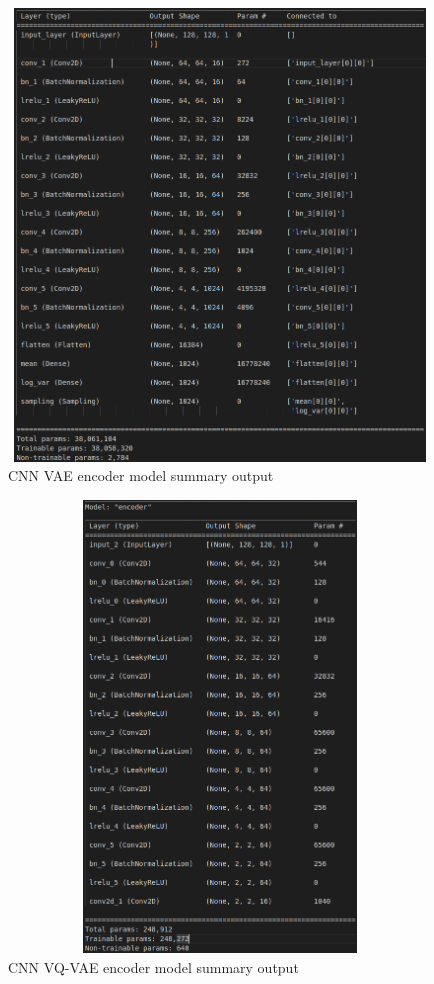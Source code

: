 \newpage

\begin{figure}[ht]
    \centering
    \includegraphics[width = 14cm, height = 12cm]{images/cnn-vae-encoder-output.png}
    \caption[]{CNN VAE encoder model summary output}
    \label{fig:cnnvaeencoderoutput}
\end{figure}

\newpage

\begin{figure}[ht]
    \centering
    \includegraphics[width = 14cm, height = 12cm]{images/cnn-vqvae-encoder-output.png}
    \caption[]{CNN VQ-VAE encoder model summary output}
    \label{fig:cnnvqvaeencoderoutput}
\end{figure}

